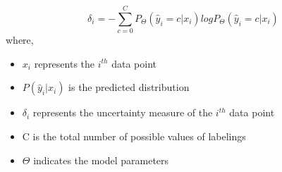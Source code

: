 \begin{equation}
    \label{equation:entropy_sampling}
    \delta_{i} = - \sum_{c=0}^{C} P_{\Theta}(\hat{y}_i = c|x_i)logP_{\Theta}(\hat{y}_i = c|x_i)
\end{equation}
where,
\begin{itemize}[label={}]
  \setlength\itemsep{0em}
  \item $x_i$ represents the $i^{th}$ data point
  \item $P(\hat{y}_i|x_i)$ is the predicted distribution
  \item $\delta_{i}$ represents the uncertainty measure of the $i^{th}$ data point
  \item C is the total number of possible values of labelings
  \item $\Theta$ indicates the model parameters
\end{itemize}

